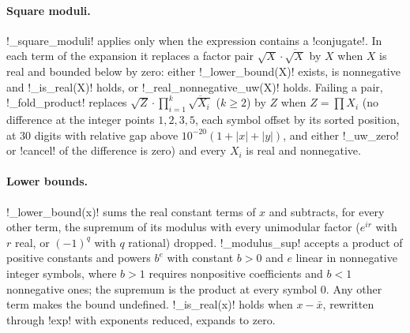 \paragraph{Square moduli.} \py!_square_moduli! applies only when the expression contains a \py!conjugate!. In each term of the expansion it replaces a factor pair $\sqrt{X}\cdot\overline{\sqrt{X}}$ by $X$ when $X$ is real and bounded below by zero: either \py!_lower_bound(X)! exists, is nonnegative and \py!_is_real(X)! holds, or \py!_real_nonnegative_uw(X)! holds. Failing a pair, \py!_fold_product! replaces $\sqrt{Z}\cdot\prod_{i=1}^k\overline{\sqrt{X_i}}$ ($k\ge2$) by $Z$ when $Z=\prod X_i$ (no difference at the integer points $1,2,3,5$, each symbol offset by its sorted position, at 30 digits with relative gap above $10^{-20}(1+|x|+|y|)$, and either \py!_uw_zero! or \py!cancel! of the difference is zero) and every $X_i$ is real and nonnegative.

\paragraph{Lower bounds.} \py!_lower_bound(x)! sums the real constant terms of $x$ and subtracts, for every other term, the supremum of its modulus with every unimodular factor ($e^{ir}$ with $r$ real, or $(-1)^q$ with $q$ rational) dropped. \py!_modulus_sup! accepts a product of positive constants and powers $b^e$ with constant $b>0$ and $e$ linear in nonnegative integer symbols, where $b>1$ requires nonpositive coefficients and $b<1$ nonnegative ones; the supremum is the product at every symbol $0$. Any other term makes the bound undefined. \py!_is_real(x)! holds when $x-\bar x$, rewritten through \py!exp! with exponents reduced, expands to zero.

